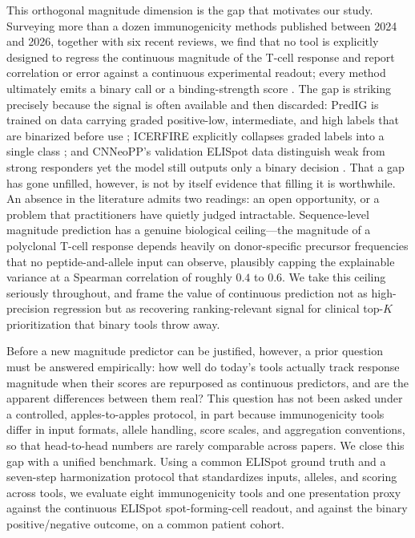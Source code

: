 This orthogonal magnitude dimension is the gap that motivates our study.
Surveying more than a dozen immunogenicity methods published between 2024 and
2026, together with six recent reviews, we find that no tool is explicitly
designed to regress the continuous magnitude of the T-cell response and report
correlation or error against a continuous experimental readout; every method
ultimately emits a binary call or a binding-strength score
\cite{explorationpub2023,Zhao2025,BiomarkerRes2025}. The gap is striking
precisely because the signal is often available and then discarded: PredIG is
trained on data carrying graded positive-low, intermediate, and high labels that
are binarized before use \cite{PredIG2025}; ICERFIRE explicitly collapses graded
labels into a single class \cite{ICERFIRE2024}; and CNNeoPP's validation ELISpot
data distinguish weak from strong responders yet the model still outputs only a
binary decision \cite{CNNeoPP2026}. That a gap has gone unfilled, however, is not
by itself evidence that filling it is worthwhile. An absence in the literature
admits two readings: an open opportunity, or a problem that practitioners have
quietly judged intractable. Sequence-level magnitude prediction has a genuine
biological ceiling---the magnitude of a polyclonal T-cell response depends
heavily on donor-specific precursor frequencies that no peptide-and-allele input
can observe, plausibly capping the explainable variance at a Spearman
correlation of roughly $0.4$ to $0.6$. We take this ceiling seriously throughout,
and frame the value of continuous prediction not as high-precision regression but
as recovering ranking-relevant signal for clinical top-$K$ prioritization that
binary tools throw away.

Before a new magnitude predictor can be justified, however, a prior question must
be answered empirically: how well do today's tools actually track response
magnitude when their scores are repurposed as continuous predictors, and are the
apparent differences between them real? This question has not been asked under a
controlled, apples-to-apples protocol, in part because immunogenicity tools
differ in input formats, allele handling, score scales, and aggregation
conventions, so that head-to-head numbers are rarely comparable across papers. We
close this gap with a unified benchmark. Using a common ELISpot ground truth and
a seven-step harmonization protocol that standardizes inputs, alleles, and
scoring across tools, we evaluate eight immunogenicity tools and one presentation
proxy against the continuous ELISpot spot-forming-cell readout, and against the
binary positive/negative outcome, on a common patient cohort.

